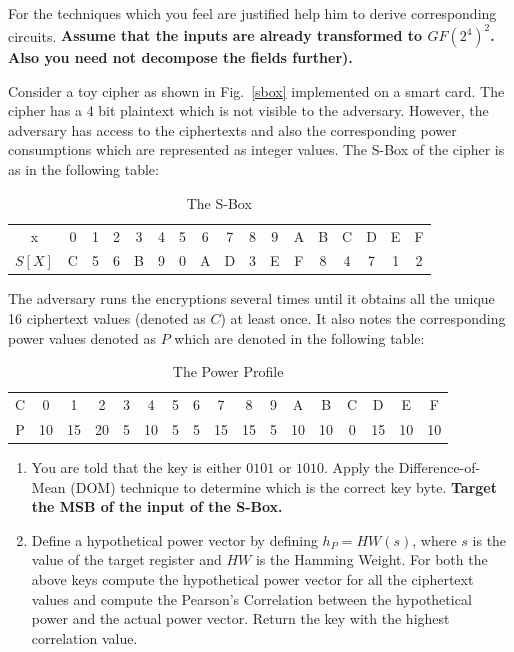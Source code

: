 \documentclass{article}
\begin{document}
\begin{questions}
For the techniques which you feel are justified help him to derive corresponding circuits. {\bf Assume that the inputs are already transformed to $GF(2^4)^2$. Also you need not decompose the fields further).} 

\question Consider a toy cipher as shown in Fig.~\ref{sbox} implemented on a smart card. The cipher has a 4 bit plaintext which is not visible to the adversary. However, the adversary has access to the ciphertexts and also the corresponding power consumptions which are represented as integer values. The S-Box of the cipher is as in the following table: 

\begin{table}[h]
\begin{tabular}{ccccccccccccccccc}\hline
x &  0 & 1 & 2 & 3 & 4 & 5 & 6 & 7 & 8 & 9 & A & B & C & D & E & F\\
$S[X]$ & C & 5 & 6 & B & 9 & 0 & A & D & 3 & E & F & 8 & 4 & 7 & 1 & 2\\\hline
\end{tabular}\caption{The S-Box}
\end{table}

The adversary runs the encryptions several times until it obtains all the unique 16 ciphertext values (denoted as $C$) at least once. It also notes the corresponding power values denoted as $P$ which are denoted in the following table:

\begin{table}[h]
\begin{tabular}{ccccccccccccccccc}\hline
C & 0 & 1 & 2 & 3 & 4 & 5 & 6 & 7 & 8 & 9 & A & B & C & D & E & F\\
P & 10 & 15 & 20 & 5 & 10 & 5 & 5 & 15 & 15 & 5 & 10 & 10 & 0 & 15 & 10 & 10\\\hline
\end{tabular}\caption{The Power Profile}
\end{table}

\begin{enumerate}
\item You are told that the key is either $0101$ or $1010$. Apply the Difference-of-Mean (DOM) technique to determine which is the correct key byte. {\bf Target the MSB of the input of the S-Box.}
\item Define a hypothetical power vector by defining 
$h_P=HW(s)$, where $s$ is the value of the target register and $HW$ is the Hamming Weight. 
For both the above keys compute the hypothetical power vector for all the 
ciphertext values and compute the Pearson's Correlation between the hypothetical power and the actual power vector. Return the key with the highest correlation value. 


\end{enumerate}
\end{questions}
\end{document}
